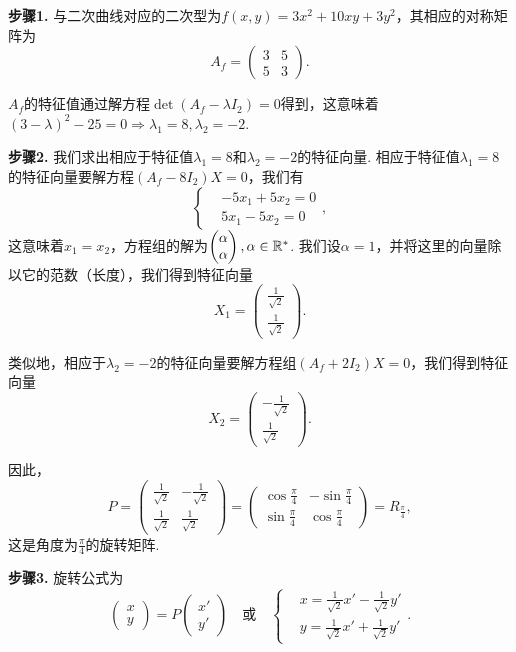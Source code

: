 {\bfseries 步骤1.} 与二次曲线对应的二次型为$f(x,y)=3x^2+10xy+3y^2$，其相应的对称矩阵为
\[
  A_f = \begin{pmatrix}
    3 & 5 \\
    5 & 3
  \end{pmatrix}.
\]

$A_f$的特征值通过解方程$\det(A_f-\lambda I_2)=0$得到，这意味着$(3-\lambda)^2-25=0\Rightarrow\lambda_1=8,\lambda_2=-2$.

{\bfseries 步骤2.} 我们求出相应于特征值$\lambda_1=8$和$\lambda_2=-2$的特征向量. 相应于特征值$\lambda_1=8$的特征向量要解方程$(A_f-8I_2)X=0$，我们有
\[
  \left\{
    \begin{aligned}
      & -5x_1 + 5x_2 = 0 \\
      & 5x_1 - 5x_2 = 0
    \end{aligned}
  \right.,
\]
这意味着$x_1=x_2$，方程组的解为$\begin{pmatrix}
  \alpha \\
  \alpha
\end{pmatrix},\alpha\in\mathbb R^\ast$. 我们设$\alpha=1$，并将这里的向量除以它的范数（长度），我们得到特征向量
\[
  X_1 = \begin{pmatrix}
    \frac1{\sqrt2} \\
    \frac1{\sqrt2}
  \end{pmatrix}.
\]

类似地，相应于$\lambda_2=-2$的特征向量要解方程组$(A_f+2I_2)X=0$，我们得到特征向量
\[
  X_2 = \begin{pmatrix}
    -\frac1{\sqrt2} \\
    \frac1{\sqrt2}
  \end{pmatrix}.
\]

因此，
\[
  P = \begin{pmatrix}
    \frac1{\sqrt2} & - \frac1{\sqrt2} \\
    \frac1{\sqrt2} & \frac1{\sqrt2}
  \end{pmatrix} =
  \begin{pmatrix}
    \cos\frac\pi4 & - \sin\frac\pi4 \\
    \sin\frac\pi4 & \cos \frac\pi4
  \end{pmatrix} = R_{\frac\pi4},
\]
这是角度为$\frac\pi4$的旋转矩阵.

{\bfseries 步骤3.} 旋转公式为
\begin{equation}\label{eq6.3}
  \begin{pmatrix}
    x \\
    y
  \end{pmatrix} = P
  \begin{pmatrix}
    x' \\
    y'
  \end{pmatrix} \quad \text{或} \quad
  \left\{
    \begin{aligned}
      & x = \frac1{\sqrt2}x' - \frac1{\sqrt2}y' \\
      & y = \frac1{\sqrt2}x' + \frac1{\sqrt2}y'
    \end{aligned}
  \right..
\end{equation}

